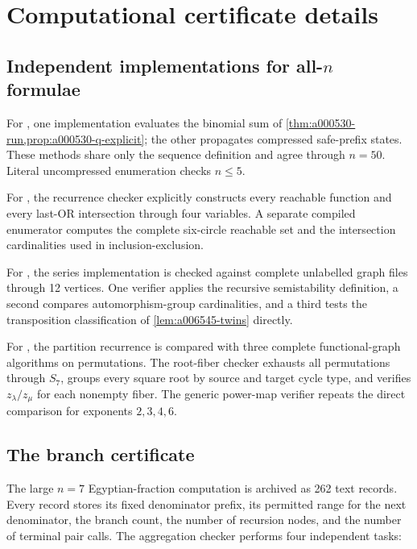 \section{Computational certificate details}
\label{app:computation}

\subsection{Independent implementations for \texorpdfstring{all-\(n\)}{all-n} formulae}

For , one implementation evaluates the binomial sum of
\cref{thm:a000530-run,prop:a000530-q-explicit}; the other propagates compressed
safe-prefix states.  These methods share only the sequence definition and
agree through \(n=50\).  Literal uncompressed enumeration checks \(n\le5\).

For , the recurrence checker explicitly constructs every
reachable function and every last-OR intersection through four variables.  A
separate compiled enumerator computes the complete six-circle reachable set
and the intersection cardinalities used in inclusion-exclusion.

For , the series implementation is checked against complete
unlabelled graph files through 12 vertices.  One verifier applies the recursive
semistability definition, a second compares automorphism-group cardinalities,
and a third tests the transposition classification of
\cref{lem:a006545-twins} directly.

For , the partition recurrence is compared with three complete
functional-graph algorithms on permutations.  The root-fiber checker exhausts
all permutations through \(S_7\), groups every square root by source and target
cycle type, and verifies \(z_\lambda/z_\mu\) for each nonempty fiber.  The
generic power-map verifier repeats the direct comparison for exponents
\(2,3,4,6\).

\subsection{The \texorpdfstring{}{A003167} branch certificate}

The large \(n=7\) Egyptian-fraction computation is archived as 262 text
records.  Every record stores its fixed denominator prefix, its permitted range
for the next denominator, the branch count, the number of recursion nodes, and
the number of terminal pair calls.  The aggregation checker performs four
independent tasks:

